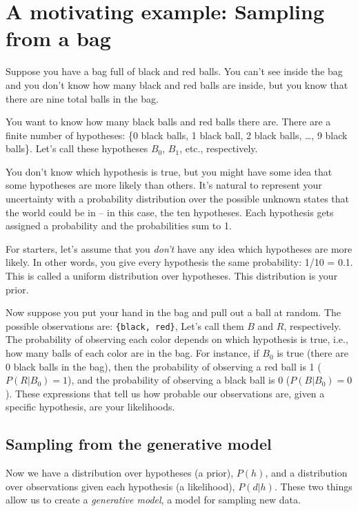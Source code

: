 \documentclass[
  letterpaper,
  DIV=11,
  numbers=noendperiod]{scrreprt}
\begin{document}
\section{A motivating example: Sampling from a bag
👝}\label{a-motivating-example-sampling-from-a-bag}

Suppose you have a bag full of black and red balls. You can't see inside
the bag and you don't know how many black and red balls are inside, but
you know that there are nine total balls in the bag.

You want to know how many black balls and red balls there are. There are
a finite number of hypotheses: \{0 black balls, 1 black ball, 2 black
balls, \ldots, 9 black balls\}. Let's call these hypotheses \(B_0\),
\(B_1\), etc., respectively.

You don't know which hypothesis is true, but you might have some idea
that some hypotheses are more likely than others. It's natural to
represent your uncertainty with a probability distribution over the
possible unknown states that the world could be in -- in this case, the
ten hypotheses. Each hypothesis gets assigned a probability and the
probabilities sum to 1.

For starters, let's assume that you \emph{don't} have any idea which
hypotheses are more likely. In other words, you give every hypothesis
the same probability: 1/10 = 0.1. This is called a uniform distribution
over hypotheses. This distribution is your prior.

Now suppose you put your hand in the bag and pull out a ball at random.
The possible observations are: \texttt{\{black,\ red\}}, Let's call them
\(B\) and \(R\), respectively. The probability of observing each color
depends on which hypothesis is true, i.e., how many balls of each color
are in the bag. For instance, if \(B_0\) is true (there are 0 black
balls in the bag), then the probability of observing a red ball is 1
(\(P(R|B_0)=1\)), and the probability of observing a black ball is 0
(\(P(B|B_0)=0\)). These expressions that tell us how probable our
observations are, given a specific hypothesis, are your likelihoods.

\subsection{Sampling from the generative
model}\label{sampling-from-the-generative-model}

Now we have a distribution over hypotheses (a prior), \(P(h)\), and a
distribution over observations given each hypothesis (a likelihood),
\(P(d|h)\). These two things allow us to create a \emph{generative
model}, a model for sampling new data.
\end{document}
